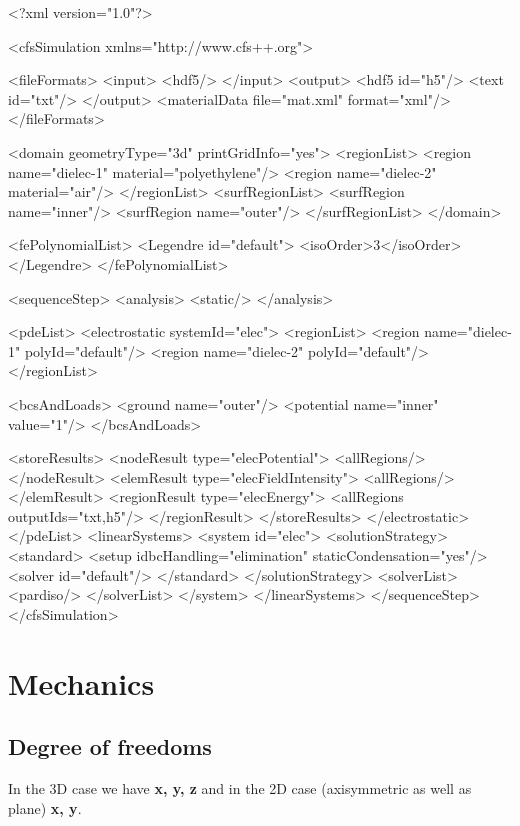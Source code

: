 {\footnotesize
\begin{xmllisting}
<?xml version="1.0"?>

<cfsSimulation xmlns="http://www.cfs++.org">
  
   <fileFormats>
    <input>
      <hdf5/>
    </input>
    <output>
      <hdf5 id="h5"/>
      <text id="txt"/>
    </output>
    <materialData file="mat.xml" format="xml"/>
  </fileFormats>
  
  <domain geometryType="3d" printGridInfo="yes">
    <regionList>
      <region name="dielec-1" material="polyethylene"/>
      <region name="dielec-2" material="air"/>
    </regionList>
    <surfRegionList>
      <surfRegion name="inner"/>
      <surfRegion name="outer"/>
    </surfRegionList>
  </domain>
  
  <fePolynomialList>
    <Legendre id="default">
       <isoOrder>3</isoOrder> 
    </Legendre>
  </fePolynomialList>
  
  
  <sequenceStep>
    <analysis>
      <static/>
    </analysis>
    
    <pdeList>
      <electrostatic systemId="elec">
        <regionList>
          <region name="dielec-1" polyId="default"/>
          <region name="dielec-2" polyId="default"/>
        </regionList>
        
        <bcsAndLoads>
          <ground name="outer"/>
          <potential name="inner" value="1"/>
        </bcsAndLoads>
        
        <storeResults>
         <nodeResult type="elecPotential">
            <allRegions/>
          </nodeResult>
          <elemResult type="elecFieldIntensity">
            <allRegions/>
          </elemResult>
          <regionResult type="elecEnergy">
            <allRegions outputIds="txt,h5"/>
          </regionResult>
        </storeResults>
      </electrostatic>
    </pdeList>
    <linearSystems>
      <system id="elec">
        <solutionStrategy>
          <standard>
            <setup idbcHandling="elimination" staticCondensation="yes"/>
            <solver id="default"/>
          </standard>
        </solutionStrategy>
        <solverList>
          <pardiso/>
        </solverList>
      </system>
    </linearSystems>
  </sequenceStep>
</cfsSimulation>
\end{xmllisting}
}


\newpage
\section{Mechanics}
\subsection{Degree of freedoms}
In the 3D case we have {\bf x, y, z} and in the 2D case
(axisymmetric as well as plane) {\bf x, y}.


